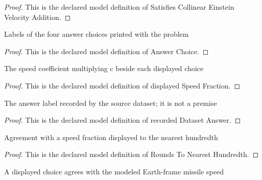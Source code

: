 \begin{proof}
  This is the declared model definition of Satisfies Collinear Einstein Velocity Addition.
\end{proof}
\begin{definition}
  \label{def:physics:phyx-mini-0553:phyxminiproblems-problemphyxmini0553-answerchoice}
  Labels of the four answer choices printed with the problem
\end{definition}
\begin{proof}
  This is the declared model definition of Answer Choice.
\end{proof}
\begin{definition}
  \label{def:physics:phyx-mini-0553:phyxminiproblems-problemphyxmini0553-displayedspeedfraction}
  The speed coefficient multiplying c beside each displayed choice
\end{definition}
\begin{proof}
  This is the declared model definition of displayed Speed Fraction.
\end{proof}
\begin{definition}
  \label{def:physics:phyx-mini-0553:phyxminiproblems-problemphyxmini0553-recordeddatasetanswer}
  The answer label recorded by the source dataset; it is not a premise
\end{definition}
\begin{proof}
  This is the declared model definition of recorded Dataset Answer.
\end{proof}
\begin{definition}
  \label{def:physics:phyx-mini-0553:phyxminiproblems-problemphyxmini0553-roundstonearesthundredth}
  Agreement with a speed fraction displayed to the nearest hundredth
\end{definition}
\begin{proof}
  This is the declared model definition of Rounds To Nearest Hundredth.
\end{proof}
\begin{definition}
  \label{def:physics:phyx-mini-0553:phyxminiproblems-problemphyxmini0553-matchesanswerchoice}
  A displayed choice agrees with the modeled Earth-frame missile speed
\end{definition}
